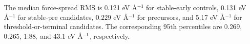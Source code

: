 The median force-spread RMS is 0.121 eV Å$^{-1}$ for stable-early controls, 0.131 eV Å$^{-1}$ for stable-pre candidates, 0.229 eV Å$^{-1}$ for precursors, and 5.17 eV Å$^{-1}$ for threshold-or-terminal candidates. The corresponding 95th percentiles are 0.269, 0.265, 1.88, and 43.1 eV Å$^{-1}$, respectively.
